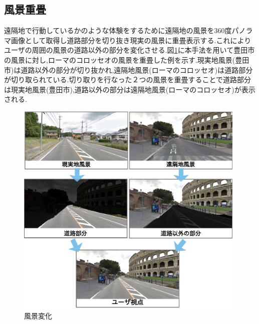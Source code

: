 
\subsection{風景重畳}
遠隔地で行動しているかのような体験をするために遠隔地の風景を360度パノラマ画像として取得し道路部分を切り抜き現実の風景に重畳表示する.これによりユーザの周囲の風景の道路以外の部分を変化させる.図\ref{figure:changescenery}に本手法を用いて豊田市の風景に対し,ローマのコロッセオの風景を重畳した例を示す.現実地風景(豊田市)は道路以外の部分が切り抜かれ,遠隔地風景(ローマのコロッセオ)は道路部分が切り取られている.切り取りを行なった２つの風景を重畳することで道路部分は現実地風景(豊田市),道路以外の部分は遠隔地風景(ローマのコロッセオ)が表示される.

\begin{figure}[htbp]
\begin{center}
\includegraphics[width=11cm]{img/02_proposedmethod/changescenery.eps} 
\end{center}
\caption{風景変化}
\label{figure:changescenery}
\end{figure} 


